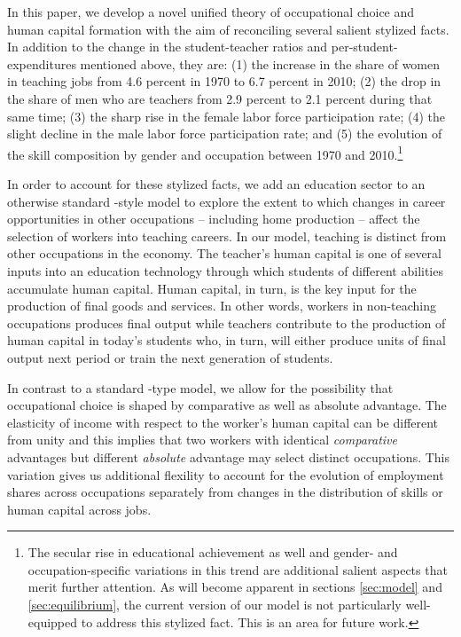 \documentclass[onehalfspacing,11pt]{article}
\begin{document}
In this paper, we develop a novel unified theory of occupational choice and human capital formation with the aim of reconciling several salient stylized facts. In addition to the change in the student-teacher ratios and per-student-expenditures mentioned above, they are: (1) the increase in the share of women in teaching jobs from 4.6 percent in 1970 to 6.7 percent in 2010; (2) the drop in the share of men who are teachers from 2.9 percent to 2.1 percent during that same time; (3) the sharp rise in the female labor force participation rate; (4) the slight decline in the male labor force participation rate; and (5) the evolution of the skill composition by gender and occupation between 1970 and 2010.\footnote{The secular rise in educational achievement as well and gender- and occupation-specific variations in this trend are additional salient aspects that merit further attention. As will become apparent in sections \ref{sec:model} and \ref{sec:equilibrium}, the current version of our model is not particularly well-equipped to address this stylized fact. This is an area for future work.}

In order to account for these stylized facts, we add an education sector to an otherwise standard \cite{Hsieh:2019}-style model to explore the extent to which changes in career opportunities in other occupations -- including home production -- affect the selection of workers into teaching careers. In our model, teaching is distinct from other occupations in the economy. The teacher's human capital is one of several inputs into an education technology through which students of different abilities accumulate human capital. Human capital, in turn, is the key input for the production of final goods and services. In other words, workers in non-teaching occupations produces final output while teachers contribute to the production of human capital in today's students who, in turn, will either produce units of final output next period or train the next generation of students.%

In contrast to a standard \cite{Roy:1951}-type model, we allow for the possibility that occupational choice is shaped by comparative as well as absolute advantage. The elasticity of income with respect to the worker's human capital can be different from unity and this implies that two workers with identical {\it comparative} advantages but different {\it absolute} advantage may select distinct occupations. This variation gives us additional flexility to account for the evolution of employment shares across occupations separately from changes in the distribution of skills or human capital across jobs.
\end{document}
